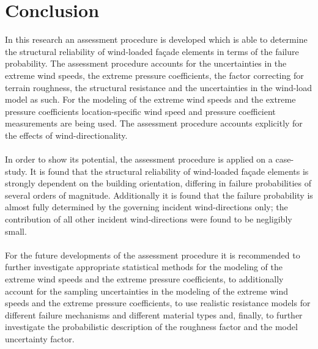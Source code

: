 \section{Conclusion}\label{conclusions}
In this research an assessment procedure is developed which is able to determine the structural reliability of wind-loaded fa\c{c}ade elements in terms of the failure probability. The assessment procedure accounts for the uncertainties in the extreme wind speeds, the extreme pressure coefficients, the factor correcting for terrain roughness, the structural resistance and the uncertainties in the wind-load model as such. For the modeling of the extreme wind speeds and the extreme pressure coefficients location-specific wind speed and pressure coefficient measurements are being used. The assessment procedure accounts explicitly for the effects of wind-directionality. \\
\\
In order to show its potential, the assessment procedure is applied on a case-study. It is found that the structural reliability of wind-loaded fa\c{c}ade elements is strongly dependent on the building orientation, differing in failure probabilities of several orders of magnitude. Additionally it is found that the failure probability is almost fully determined by the governing incident wind-directions only; the contribution of all other incident wind-directions were found to be negligibly small. \\
\\
For the future developments of the assessment procedure it is recommended to further investigate appropriate statistical methods for the modeling of the extreme wind speeds and the extreme pressure coefficients, to additionally account for the sampling uncertainties in the modeling of the extreme wind speeds and the extreme pressure coefficients, to use realistic resistance models for different failure mechanisms and different material types and, finally, to further investigate the probabilistic description of the roughness factor and the model uncertainty factor.


\nocite{*}






%
%
%


